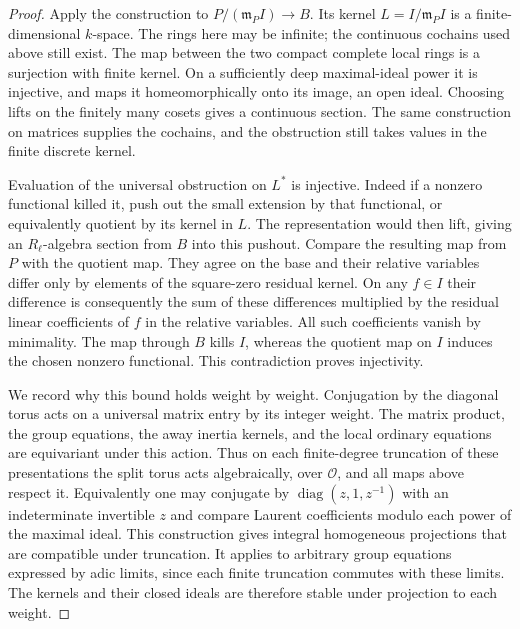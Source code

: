 \documentclass[a4paper,11pt]{article}
\theoremstyle{definition}
\theoremstyle{remark}
\numberwithin{equation}{section}
\newcommand{\OO}{\mathcal O}
\begin{document}
\begin{proof}
Apply the construction to \(P/(\mathfrak m_P I)\to B\).
Its kernel \(L=I/\mathfrak m_P I\) is a finite-dimensional
\(k\)-space. The rings here may be infinite; the continuous
cochains used above still exist. The map between the two
compact complete local rings is a surjection with finite kernel.
On a sufficiently deep maximal-ideal power it is injective, and
maps it homeomorphically onto its image, an open ideal. Choosing
lifts on the finitely many cosets gives a continuous section.
The same construction on matrices supplies the cochains, and
the obstruction still takes values in the finite discrete kernel.

Evaluation of the universal obstruction on \(L^*\) is injective.
Indeed if a nonzero functional killed it, push out the small
extension by that functional, or equivalently quotient by its
kernel in \(L\). The representation would then lift, giving an
\(R_\ell\)-algebra section from \(B\) into this pushout. Compare
the resulting map from \(P\) with the quotient map. They agree
on the base and their relative variables differ only by
elements of the square-zero residual kernel. On any \(f\in I\)
their difference is consequently the sum of these differences
multiplied by the residual linear coefficients of \(f\) in
the relative variables. All such coefficients vanish by minimality.
The map through \(B\) kills \(I\), whereas the quotient map on
\(I\) induces the chosen nonzero functional. This contradiction
proves injectivity.

We record why this bound holds weight by weight. Conjugation
by the diagonal torus acts on a universal matrix entry by its
integer weight. The matrix product, the group equations, the
away inertia kernels, and the local ordinary equations are
equivariant under this action. Thus on each finite-degree
truncation of these presentations the split torus acts
algebraically, over \(\OO\), and all maps above respect it.
Equivalently one may conjugate by
\(\operatorname{diag}(z,1,z^{-1})\) with an indeterminate
invertible \(z\) and compare Laurent coefficients modulo each
power of the maximal ideal. This construction gives integral
homogeneous projections that are compatible under truncation.
It applies to arbitrary group equations expressed by adic
limits, since each finite truncation commutes with these limits.
The kernels and their closed ideals are therefore stable under
projection to each weight.


\end{proof}
\end{document}
